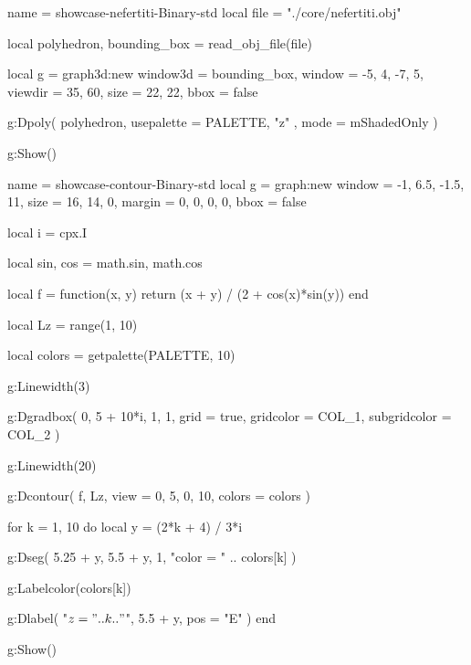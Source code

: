 \documentclass{tutodoc}
\newcommand{\PALETTE}{Binary}
\begin{document}

\vfill

\begin{luadraw}{name = showcase-nefertiti-\PALETTE-std}
local file = "./core/nefertiti.obj"

local polyhedron, bounding_box = read_obj_file(file)

local g = graph3d:new{
  window3d = bounding_box,
  window   = {-5, 4, -7, 5},
  viewdir  = {35, 60},
  size     = {22, 22},
  bbox     = false
}

g:Dpoly(
  polyhedron,
  {
    usepalette = {PALETTE, "z" },
    mode       = mShadedOnly
  }
)

g:Show()
\end{luadraw}



\newpage

\begin{luadraw}{name = showcase-contour-\PALETTE-std}
local g = graph:new{
  window = {-1, 6.5, -1.5, 11},
  size   = {16, 14, 0},
  margin = {0, 0, 0, 0},
  bbox   = false
}

local i = cpx.I

local sin, cos = math.sin, math.cos

local f = function(x, y)
  return (x + y) / (2 + cos(x)*sin(y))
end

local Lz = range(1, 10)

local colors = getpalette(PALETTE, 10)

g:Linewidth(3)

g:Dgradbox(
  {0, 5 + 10*i, 1, 1},
  {
    grid         = true,
    gridcolor    = COL_1,
    subgridcolor = COL_2
  }
)

g:Linewidth(20)

g:Dcontour(
  f,
  Lz,
  {
    view   = {0, 5, 0, 10},
    colors = colors
  }
)

for k = 1, 10 do
  local y = (2*k + 4) / 3*i

  g:Dseg(
    {5.25 + y, 5.5 + y},
    1,
    "color = " .. colors[k]
  )

  g:Labelcolor(colors[k])

  g:Dlabel(
    "$z = " .. k .. "$",
    5.5 + y,
    {pos = "E"}
  )
end

g:Show()
\end{luadraw}


\end{document}

